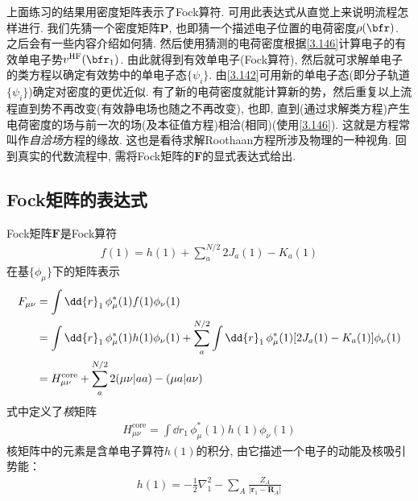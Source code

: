 上面练习的结果用密度矩阵表示了Fock算符. 
可用此表达式从直觉上来说明\hft 流程怎样进行. 
我们先猜一个密度矩阵$\mathbf{P}$, 
也即猜一个描述电子位置的电荷密度$\rho(\bfr)$. 
之后会有一些内容介绍如何猜. 
然后使用猜测的电荷密度根据\autoref{3.146}计算电子的有效单电子势$v^\mathrm{HF}(\bfr_1)$. 
由此就得到有效单电子\ha (Fock算符), 
然后就可求解单电子的类\sch 方程以确定有效势中的单电子态$\{\psi_i\}$. 
由\autoref{3.142}可用新的单电子态(即分子轨道$\{\psi_i\}$)确定对密度的更优近似. 
有了新的电荷密度就能计算新的\hft 势，然后重复以上流程直到\hft 势不再改变(有效静电场也随之不再改变), 
也即, 
直到(通过求解类\sch 方程)产生电荷密度的场与前一次的场(及\hft 本征值方程)相洽(相同)(使用\autoref{3.146}). 
这就是\hft 方程常叫作\emph{自洽场}方程的缘故. 
这也是看待求解Roothaan方程所涉及物理的一种视角. 
回到真实的代数流程中, 
需将Fock矩阵的$\mathbf{F}$的显式表达式给出.

\subsection{Fock矩阵的表达式}
Fock矩阵$\mathbf{F}$是Fock算符
\begin{align}
	\label{3.147}
	f(1) = h(1) + \sum_{a}^{N/2}2J_a(1) -K_a(1)
\end{align}
在基$\{\phi_\mu\}$下的矩阵表示
\begin{align}
	\label{3.148}
	F_{\mu\nu} & = \int\dd{r}_1\,\phi_\mu^*(1)f(1)\phi_\nu(1)\notag\\
	& = \int\dd{r}_1\,\phi_\mu^*(1)h(1)\phi_\nu(1) + \sum_{a}^{N/2}\int\dd{r}_1\,\phi_\mu^*(1)[2J_a(1)-K_a(1)]\phi_\nu(1)\notag\\
	& = H_{\mu\nu}^\mathrm{core} + \sum_{a}^{N/2}2(\mu\nu|aa)-(\mu a|a\nu)
\end{align}
式中定义了\emph{核\ha}矩阵
\begin{align}
	H_{\mu\nu}^\mathrm{core} = \int\dd{r}_1\,\phi_\mu^*(1)h(1)\phi_\nu(1)
\end{align}
核\ha 矩阵中的元素是含单电子算符$h(1)$的积分, 
由它描述一个电子的动能及核吸引势能：
\begin{align}
	h(1) = -\frac{1}{2}\nabla_1^2 - \sum_A\frac{Z_A}{|\mathbf{r}_1-\mathbf{R}_A|}
\end{align}

